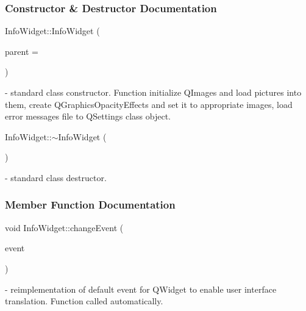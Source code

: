 \subsubsection{Constructor \& Destructor Documentation}
\mbox{\label{classInfoWidget_a19f07d861d22be4881361a5a32e86451}} 
{\footnotesize\ttfamily Info\+Widget\+::\texorpdfstring{Info\+Widget}{InfoWidget} (\begin{DoxyParamCaption}\item[{Q\+Widget $\ast$}]{parent = {} }\end{DoxyParamCaption}){\ttfamily [explicit]}} - standard class constructor. Function initialize Q\+Images and load pictures into them, create Q\+Graphics\+Opacity\+Effects and set it to appropriate images, load error messages file to Q\+Settings class object. 

\mbox{\label{classInfoWidget_aefa39a20c91f6dbc8cbc0b6d9bf7623e}} 
{\footnotesize\ttfamily Info\+Widget\+::\texorpdfstring{$\sim$\+Info\+Widget}{~InfoWidget} (\begin{DoxyParamCaption}{ }\end{DoxyParamCaption})} - standard class destructor.



\subsubsection{Member Function Documentation}
\mbox{\label{classInfoWidget_ab9215d8a0db2c91c669dba5e67e27f54}} 
{\footnotesize\ttfamily void Info\+Widget\+::\texorpdfstring{change\+Event}{changeEvent} (\begin{DoxyParamCaption}\item[{Q\+Event $\ast$}]{event }\end{DoxyParamCaption}){\ttfamily [protected]}} - reimplementation of default event for QWidget to enable user interface translation. Function called automatically.


